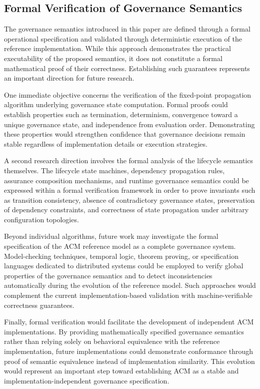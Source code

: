 \documentclass[10pt]{article}
\begin{document}
\subsection{Formal Verification of Governance Semantics}
\label{sec:future_formal_verification}

The governance semantics introduced in this paper are defined through a formal operational specification and validated through deterministic execution of the reference implementation. While this approach demonstrates the practical executability of the proposed semantics, it does not constitute a formal mathematical proof of their correctness. Establishing such guarantees represents an important direction for future research.

One immediate objective concerns the verification of the fixed-point propagation algorithm underlying governance state computation. Formal proofs could establish properties such as termination, determinism, convergence toward a unique governance state, and independence from evaluation order. Demonstrating these properties would strengthen confidence that governance decisions remain stable regardless of implementation details or execution strategies.

A second research direction involves the formal analysis of the lifecycle semantics themselves. The lifecycle state machines, dependency propagation rules, assurance composition mechanisms, and runtime governance semantics could be expressed within a formal verification framework in order to prove invariants such as transition consistency, absence of contradictory governance states, preservation of dependency constraints, and correctness of state propagation under arbitrary configuration topologies.

Beyond individual algorithms, future work may investigate the formal specification of the ACM reference model as a complete governance system. Model-checking techniques, temporal logic, theorem proving, or specification languages dedicated to distributed systems could be employed to verify global properties of the governance semantics and to detect inconsistencies automatically during the evolution of the reference model. Such approaches would complement the current implementation-based validation with machine-verifiable correctness guarantees.

Finally, formal verification would facilitate the development of independent ACM implementations. By providing mathematically specified governance semantics rather than relying solely on behavioral equivalence with the reference implementation, future implementations could demonstrate conformance through proof of semantic equivalence instead of implementation similarity. This evolution would represent an important step toward establishing ACM as a stable and implementation-independent governance specification.
\end{document}
